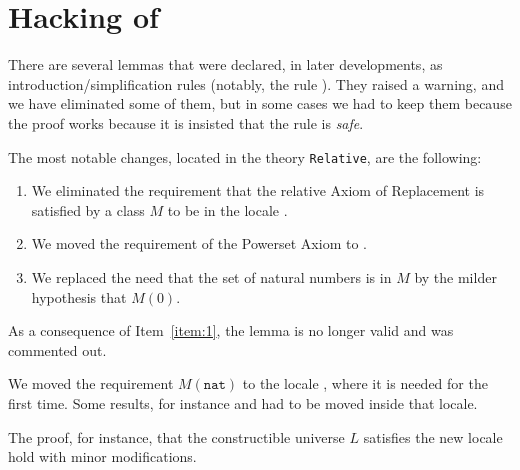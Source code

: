 \section{Hacking of }

There are several lemmas that were declared, in later developments, as
introduction/simplification rules (notably, the rule
). They raised a warning, and we have 
eliminated some of them, but in some cases we had to keep them because
the proof works because it is insisted that the rule is \emph{safe}.

The most notable changes, located in the theory \texttt{Relative}, are
the following:
\begin{enumerate}
\item\label{item:1} We eliminated the requirement that the relative Axiom of Replacement
  is satisfied by a class $M$ to be in the locale . 
\item\label{item:2} We moved the requirement of the Powerset Axiom to . 
\item\label{item:3} We replaced the need that the set of natural numbers is in $M$ by the
  milder hypothesis that $M(0)$.
\end{enumerate}

As a consequence of Item~\ref{item:1}, the lemma
 is no longer valid and was commented
out.

We moved the requirement $M(\mathtt{nat})$ to the locale
, where it is needed for the first time. Some results,
for instance  and 
 had to be moved inside that
locale.

The proof, for instance, that the constructible universe $L$ satisfies
the new locale  hold with minor
modifications.



